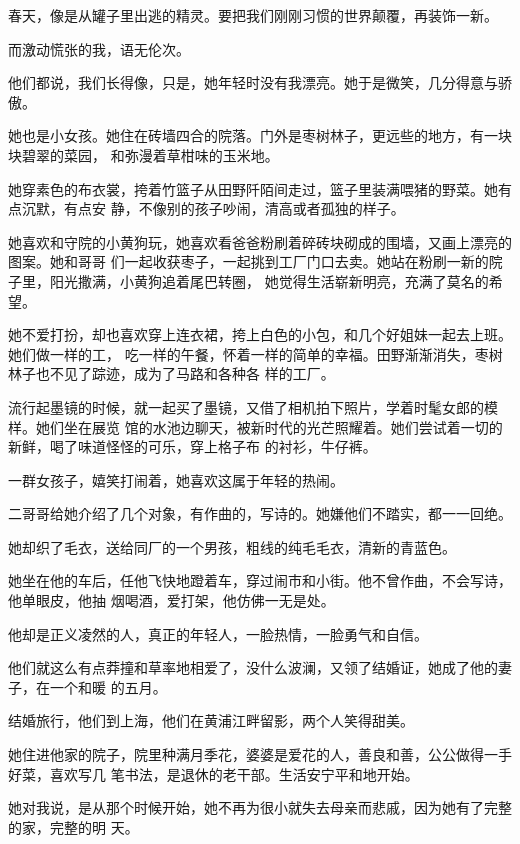 		春天，像是从罐子里出逃的精灵。要把我们刚刚习惯的世界颠覆，再装饰一新。

		而激动慌张的我，语无伦次。

	\endwriting



		他们都说，我们长得像，只是，她年轻时没有我漂亮。她于是微笑，几分得意与骄傲。

		她也是小女孩。她住在砖墙四合的院落。门外是枣树林子，更远些的地方，有一块块碧翠的菜园，
	和弥漫着草柑味的玉米地。

		她穿素色的布衣裳，挎着竹篮子从田野阡陌间走过，篮子里装满喂猪的野菜。她有点沉默，有点安
	静，不像别的孩子吵闹，清高或者孤独的样子。


		她喜欢和守院的小黄狗玩，她喜欢看爸爸粉刷着碎砖块砌成的围墙，又画上漂亮的图案。她和哥哥
	们一起收获枣子，一起挑到工厂门口去卖。她站在粉刷一新的院子里，阳光撒满，小黄狗追着尾巴转圈，
	她觉得生活崭新明亮，充满了莫名的希望。


		她不爱打扮，却也喜欢穿上连衣裙，挎上白色的小包，和几个好姐妹一起去上班。她们做一样的工，
	吃一样的午餐，怀着一样的简单的幸福。田野渐渐消失，枣树林子也不见了踪迹，成为了马路和各种各
	样的工厂。


		流行起墨镜的时候，就一起买了墨镜，又借了相机拍下照片，学着时髦女郎的模样。她们坐在展览
	馆的水池边聊天，被新时代的光芒照耀着。她们尝试着一切的新鲜，喝了味道怪怪的可乐，穿上格子布
	的衬衫，牛仔裤。


		一群女孩子，嬉笑打闹着，她喜欢这属于年轻的热闹。

		二哥哥给她介绍了几个对象，有作曲的，写诗的。她嫌他们不踏实，都一一回绝。

		她却织了毛衣，送给同厂的一个男孩，粗线的纯毛毛衣，清新的青蓝色。

		她坐在他的车后，任他飞快地蹬着车，穿过闹市和小街。他不曾作曲，不会写诗，他单眼皮，他抽
	烟喝酒，爱打架，他仿佛一无是处。

		他却是正义凌然的人，真正的年轻人，一脸热情，一脸勇气和自信。


		他们就这么有点莽撞和草率地相爱了，没什么波澜，又领了结婚证，她成了他的妻子，在一个和暖
	的五月。

		结婚旅行，他们到上海，他们在黄浦江畔留影，两个人笑得甜美。

		她住进他家的院子，院里种满月季花，婆婆是爱花的人，善良和善，公公做得一手好菜，喜欢写几
	笔书法，是退休的老干部。生活安宁平和地开始。

		她对我说，是从那个时候开始，她不再为很小就失去母亲而悲戚，因为她有了完整的家，完整的明
	天。

